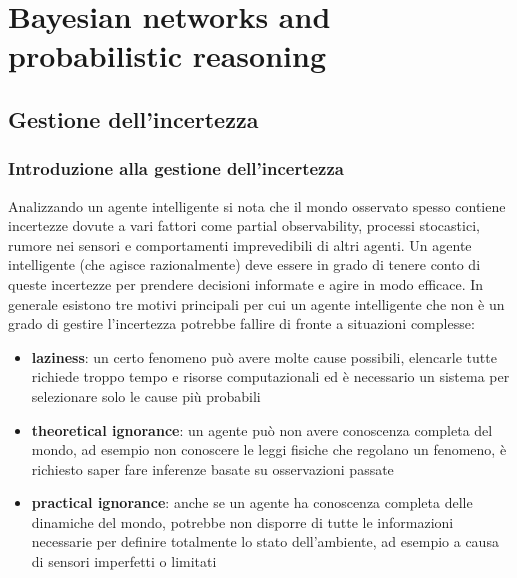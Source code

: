 \section{Bayesian networks and probabilistic reasoning}
\subsection{Gestione dell'incertezza}
\subsubsection*{Introduzione alla gestione dell'incertezza}
Analizzando un agente intelligente si nota che il mondo osservato spesso contiene incertezze dovute a vari fattori come
partial observability, processi stocastici, rumore nei sensori e comportamenti imprevedibili di altri agenti. Un agente
intelligente (che agisce razionalmente) deve essere in grado di tenere conto di queste incertezze per prendere decisioni
informate e agire in modo efficace. In generale esistono tre motivi principali per cui un agente intelligente che non
è un grado di gestire l'incertezza potrebbe fallire di fronte a situazioni complesse:
\begin{itemize}
	\item \textbf{laziness}: un certo fenomeno può avere molte cause possibili, elencarle tutte richiede troppo tempo e
	risorse computazionali ed è necessario un sistema per selezionare solo le cause più probabili
	\item \textbf{theoretical ignorance}: un agente può non avere conoscenza completa del mondo, ad esempio non conoscere
	le leggi fisiche che regolano un fenomeno, è richiesto saper fare inferenze basate su osservazioni passate
	\item \textbf{practical ignorance}: anche se un agente ha conoscenza completa delle dinamiche del mondo, potrebbe non
	disporre di tutte le informazioni necessarie per definire totalmente lo stato dell'ambiente, ad esempio a causa di
	sensori imperfetti o limitati
\end{itemize}

